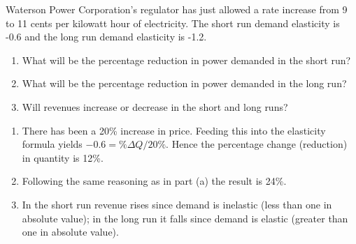 \begin{enumialphparenastyle}
\begin{ex}\label{ex:ch4ex6}
Waterson Power Corporation's regulator has just allowed a rate increase from 9 to 11 cents per kilowatt hour of electricity. The short run demand elasticity is -0.6 and the long run demand elasticity is -1.2.
\begin{enumerate}
	\item	What will be the percentage reduction in power demanded in the short run?
	\item	What will be the percentage reduction in power demanded in the long run?
	\item	Will revenues increase or decrease in the short and long runs?
\end{enumerate}
\begin{sol}
\begin{enumerate}
	\item	There has been a 20\% increase in price. Feeding this into the elasticity formula yields $-0.6=\%\Delta Q/20\%$. Hence the percentage change (reduction) in quantity is 12\%.
	\item	Following the same reasoning as in part (a) the result is 24\%.
	\item	In the short run revenue rises since demand is inelastic (less than one in absolute value); in the long run it falls since demand is elastic (greater than one in absolute value).
\end{enumerate}
\end{sol}
\end{ex}


\end{enumialphparenastyle}
